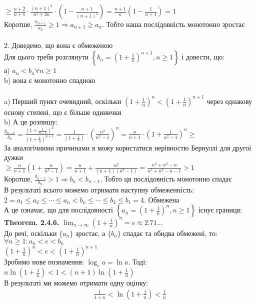 \documentclass[a4paper, 14pt]{extarticle}
\def\huge{\displaystyle}
\def\bigline{\vspace{5mm}\\}
\def\bigline{\vspace{5mm}\\}
\def\sequence#1{$\displaystyle \left\{ {#1}, n\geq1 \right\}$}
\begin{document}
	$\displaystyle \boxed{\geq} \frac{n+2}{n+1} \cdot \frac{(n+1)^2}{n^2+2n} \cdot \left(1 - \frac{n+1}{(n+1)^2} \right) = \frac{n+1}{n} \left(1-\frac{1}{n+1} \right) = 1$\\
	Коротше, $\displaystyle \frac{a_{n+1}}{a_n} \geq 1 \Rightarrow a_{n+1} \geq a_n$. Тобто наша послідовність монотонно зростає\\
	\\
	2. Доведемо, що вона є обмеженою\\
	Для цього требя розглянути \sequence{b_n = \left(1+\frac{1}{n} \right)^{n+1}} і довести, що:\\
	а) $a_n < b_n \forall n \geq 1$\\
	b) вона є монотонно спадною\\
	\\
	a) Перший пункт очевидний, оскільки $\displaystyle \left(1+\frac{1}{n} \right)^n < \left(1+\frac{1}{n} \right)^{n+1}$ через однакову основу степені, що є більше одинички\\
	b) А це розпишу:\\
	$\displaystyle \frac{b_{n-1}}{b_n} = \frac{\displaystyle \left(1+\frac{1}{n-1} \right)^{n}}{\displaystyle \left(1+\frac{1}{n} \right)^{n+1}} = \frac{1}{\displaystyle \left(1+\frac{1}{n}\right)} \cdot \left(\frac{n^2}{n^2-1}\right)^n = \frac{n}{n+1} \cdot \left(1+\frac{1}{n^2-1} \right)^n \boxed{\geq}$\\
	За аналогічними причинами я можу користатися нерівностю Бернуллі для другої дужки\\
	$\displaystyle \boxed{\geq} \frac{n}{n+1} \left(1+\frac{n}{n^2-1}\right) = \frac{n}{n+1} + \frac{n^2}{(n+1)(n^2-1)} = \frac{n^3+n^2-n}{n^3+n^2-n-1} > 1$\\
	Коротше, $\displaystyle \frac{b_{n-1}}{b_n} > 1 \Rightarrow b_n < b_{n-1}$. Тобто ця послідовність монотонно спадає\\
	В результаті всього можемо отримати наступну обмеженність:\\
	$2=a_1 \leq a_2 \leq \cdots \leq a_n < b_n \leq \cdots \leq b_2 \leq b_1 = 4$. Обмежена\\
	А це означає, що для послідовності \sequence{a_n = \left(1+\frac{1}{n}\right)^n} існує границя:\\
	\textbf{Theorem. 2.4.6.}
	$\huge \lim_{n \to \infty}\left(1+\frac{1}{n} \right)^n = e \approx 2.71...$
	\bigline
	До речі, оскільки $\{a_n \}$ зростає, а $\{b_n \}$ спадає та обидва обмежені, то:\\
	$\forall n \geq 1: a_n<e<b_n$\\
	$\displaystyle \left(1+\frac{1}{n} \right)^n < e < \left(1+\frac{1}{n} \right)^{n+1}$\\
	Зробимо нове позначення: $\log_{e} a =\ln a$. Тоді:\\
	$\displaystyle n \ln \left(1+\frac{1}{n} \right) < 1 < (n+1) \ln \left(1+\frac{1}{n} \right)$\\
	В результаті ми можемо отримати одну оцінку:
	\begin{align*}
	 \frac{1}{1+n} < \ln (1+\frac{1}{n}) < \frac{1}{n}
	\end{align*}\\
	
\end{document}
